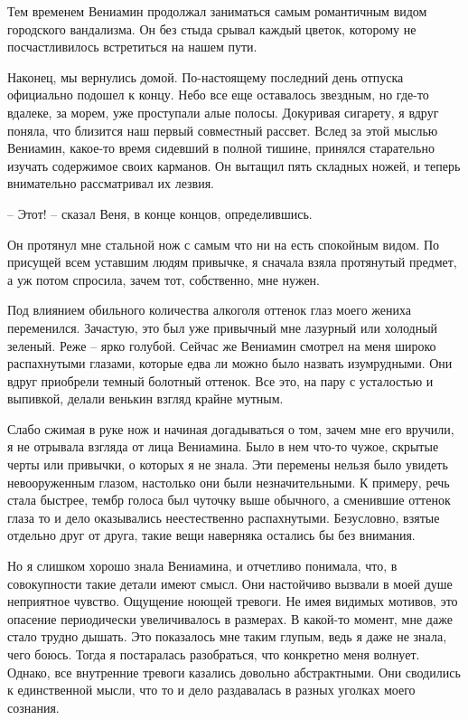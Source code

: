 \documentclass[
]{book}
\begin{document}
Тем временем Вениамин продолжал заниматься самым романтичным видом городского вандализма. Он без стыда срывал каждый цветок, которому не посчастливилось встретиться на нашем пути.

Наконец, мы вернулись домой. По-настоящему последний день отпуска официально подошел к концу. Небо все еще оставалось звездным, но где-то вдалеке, за морем, уже проступали алые полосы. Докуривая сигарету, я вдруг поняла, что близится наш первый совместный рассвет. Вслед за этой мыслью Вениамин, какое-то время сидевший в полной тишине, принялся старательно изучать содержимое своих карманов. Он вытащил пять складных ножей, и теперь внимательно рассматривал их лезвия.

-- Этот! -- сказал Веня, в конце концов, определившись.

Он протянул мне стальной нож с самым что ни на есть спокойным видом. По присущей всем уставшим людям привычке, я сначала взяла протянутый предмет, а уж потом спросила, зачем тот, собственно, мне нужен.

Под влиянием обильного количества алкоголя оттенок глаз моего жениха переменился. Зачастую, это был уже привычный мне лазурный или холодный зеленый. Реже -- ярко голубой. Сейчас же Вениамин смотрел на меня широко распахнутыми глазами, которые едва ли можно было назвать изумрудными. Они вдруг приобрели темный болотный оттенок. Все это, на пару с усталостью и выпивкой, делали венькин взгляд крайне мутным.

Слабо сжимая в руке нож и начиная догадываться о том, зачем мне его вручили, я не отрывала взгляда от лица Вениамина. Было в нем что-то чужое, скрытые черты или привычки, о которых я не знала. Эти перемены нельзя было увидеть невооруженным глазом, настолько они были незначительными. К примеру, речь стала быстрее, тембр голоса был чуточку выше обычного, а сменившие оттенок глаза то и дело оказывались неестественно распахнутыми. Безусловно, взятые отдельно друг от друга, такие вещи наверняка остались бы без внимания.

Но я слишком хорошо знала Вениамина, и отчетливо понимала, что, в совокупности такие детали имеют смысл. Они настойчиво вызвали в моей душе неприятное чувство. Ощущение ноющей тревоги. Не имея видимых мотивов, это опасение периодически увеличивалось в размерах. В какой-то момент, мне даже стало трудно дышать. Это показалось мне таким глупым, ведь я даже не знала, чего боюсь. Тогда я постаралась разобраться, что конкретно меня волнует. Однако, все внутренние тревоги казались довольно абстрактными. Они сводились к единственной мысли, что то и дело раздавалась в разных уголках моего сознания.
\end{document}
